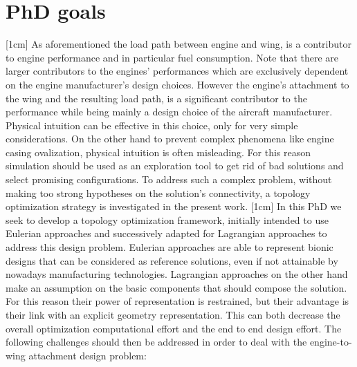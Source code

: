\section*{PhD goals}
[1cm]
As aforementioned the load path between engine and wing, is a contributor to engine performance and in particular fuel consumption. Note that there are larger contributors to the engines’ performances which are exclusively dependent on the engine manufacturer's design choices. However the engine's attachment to the wing and the resulting load path, is a significant contributor to the performance while being mainly a design choice of the aircraft manufacturer.
Physical intuition can be effective in this choice, only for very simple considerations. On the other hand to prevent complex phenomena like engine casing ovalization, physical intuition is often misleading. For this reason simulation should be used as an exploration tool to get rid of bad solutions and select promising configurations. To address such a complex problem, without making too strong hypotheses on the solution's connectivity, a topology optimization strategy is investigated in the present work. 
[1cm]
In this PhD we seek to develop a topology optimization framework, initially intended to use Eulerian approaches and successively adapted for Lagrangian approaches to address this design problem. Eulerian approaches are able to represent bionic designs that can be considered as reference solutions, even if not attainable by nowadays manufacturing technologies. Lagrangian approaches on the other hand make an assumption on the basic components that should compose the solution. For this reason their power of representation is restrained, but their advantage is their link with an explicit geometry representation. This can both decrease the overall optimization computational effort and the end to end design effort.
The following challenges should then be addressed in order to deal with the engine-to-wing attachment design problem:
